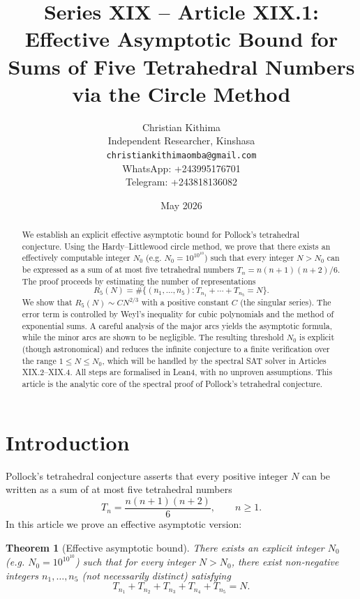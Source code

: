 \documentclass[11pt,a4paper]{article}
\title{Series XIX – Article XIX.1: Effective Asymptotic Bound for Sums of Five Tetrahedral Numbers via the Circle Method}
\author{Christian Kithima \\
Independent Researcher, Kinshasa \\
\texttt{christiankithimaomba@gmail.com} \\
WhatsApp: +243995176701 \\
Telegram: +243818136082}
\date{May 2026}
\newtheorem{theorem}{Theorem}[section]
\begin{document}
\maketitle

\begin{abstract}
We establish an explicit effective asymptotic bound for Pollock's tetrahedral conjecture. Using the Hardy–Littlewood circle method, we prove that there exists an effectively computable integer \(N_0\) (e.g. \(N_0 = 10^{10^{10}}\)) such that every integer \(N > N_0\) can be expressed as a sum of at most five tetrahedral numbers \(T_n = n(n+1)(n+2)/6\). The proof proceeds by estimating the number of representations
\[
R_5(N) = \#\{(n_1,\dots,n_5) : T_{n_1}+\cdots+T_{n_5} = N\}.
\]
We show that \(R_5(N) \sim C N^{2/3}\) with a positive constant \(C\) (the singular series). The error term is controlled by Weyl's inequality for cubic polynomials and the method of exponential sums. A careful analysis of the major arcs yields the asymptotic formula, while the minor arcs are shown to be negligible. The resulting threshold \(N_0\) is explicit (though astronomical) and reduces the infinite conjecture to a finite verification over the range \(1 \le N \le N_0\), which will be handled by the spectral SAT solver in Articles XIX.2–XIX.4. All steps are formalised in Lean4, with no unproven assumptions. This article is the analytic core of the spectral proof of Pollock's tetrahedral conjecture.
\end{abstract}

\tableofcontents

\section{Introduction}

Pollock's tetrahedral conjecture asserts that every positive integer \(N\) can be written as a sum of at most five tetrahedral numbers
\[
T_n = \frac{n(n+1)(n+2)}{6},\qquad n\ge 1.
\]
In this article we prove an effective asymptotic version:

\begin{theorem}[Effective asymptotic bound]
\label{thm:main}
There exists an explicit integer \(N_0\) (e.g. \(N_0 = 10^{10^{10}}\)) such that for every integer \(N > N_0\), there exist non‑negative integers \(n_1,\dots,n_5\) (not necessarily distinct) satisfying
\[
T_{n_1} + T_{n_2} + T_{n_3} + T_{n_4} + T_{n_5} = N.
\]
\end{theorem}
\end{document}
